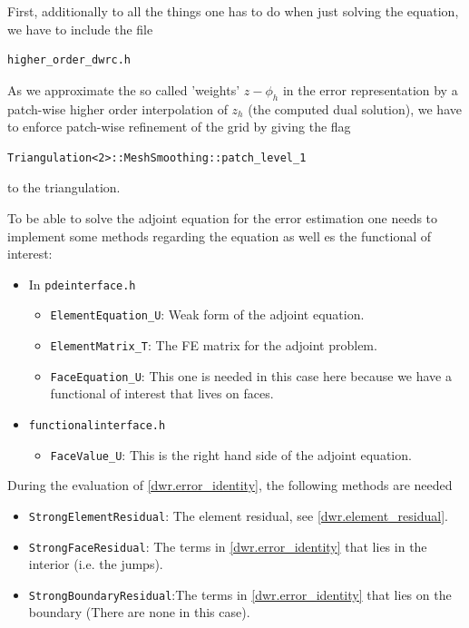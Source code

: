 First, additionally to all the things one has to do when just solving the equation, we have to include the file
\begin{verbatim}
higher_order_dwrc.h
\end{verbatim}

As we approximate the so called 'weights' $z-\phi_h$ in the error representation by a patch-wise higher order interpolation of $z_h$ (the computed dual solution), we have to enforce patch-wise refinement of the grid by giving the flag 
\begin{verbatim}
Triangulation<2>::MeshSmoothing::patch_level_1
\end{verbatim}
to the triangulation. 

To be able to solve the adjoint equation for the error estimation one needs to implement some methods regarding the equation as well es the functional of interest:
\begin{itemize}
\item In {\verb!pdeinterface.h!}
\begin{itemize}
\item {\verb!ElementEquation_U!}: Weak form of the adjoint equation.
\item {\verb!ElementMatrix_T!}: The FE matrix for the adjoint problem.
\item {\verb!FaceEquation_U!}: This one is needed in this case here because we have a functional of interest that lives on faces. 
\end{itemize}
\item {\verb!functionalinterface.h!}
\begin{itemize}
\item {\verb!FaceValue_U!}: This is the right hand side of the adjoint equation.
\end{itemize}
\end{itemize}
During the  evaluation of \eqref{dwr.error_identity}, the following methods are needed
\begin{itemize}
\item {\verb!StrongElementResidual!}: The element residual, see \eqref{dwr.element_residual}.
\item {\verb!StrongFaceResidual!}: The terms in \eqref{dwr.error_identity} that lies in the interior (i.e. the jumps).
\item {\verb!StrongBoundaryResidual!}:The terms in \eqref{dwr.error_identity} that lies on the boundary (There are none in this case).
\end{itemize}

